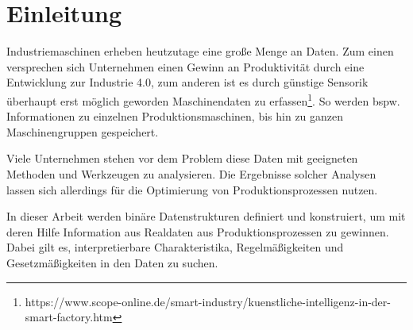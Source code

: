 \chapter{Einleitung}
\label{chp:introduction}
Industriemaschinen erheben heutzutage eine große Menge an Daten. Zum einen versprechen sich Unternehmen einen Gewinn an Produktivität durch eine Entwicklung zur Industrie 4.0, zum anderen ist es durch günstige Sensorik überhaupt erst möglich geworden Maschinendaten zu erfassen\footnote{https://www.scope-online.de/smart-industry/kuenstliche-intelligenz-in-der-smart-factory.htm}. So werden bspw. Informationen zu einzelnen Produktionsmaschinen, bis hin zu ganzen Maschinengruppen gespeichert.
 
Viele Unternehmen stehen vor dem Problem diese Daten mit geeigneten Methoden und Werkzeugen zu analysieren. Die Ergebnisse solcher Analysen lassen sich allerdings für die Optimierung von Produktionsprozessen nutzen.

In dieser Arbeit werden binäre Datenstrukturen definiert und konstruiert, um mit deren Hilfe Information aus Realdaten aus Produktionsprozessen zu gewinnen. Dabei gilt es, interpretierbare Charakteristika, Regelmäßigkeiten und Gesetzmäßigkeiten in den Daten zu suchen.